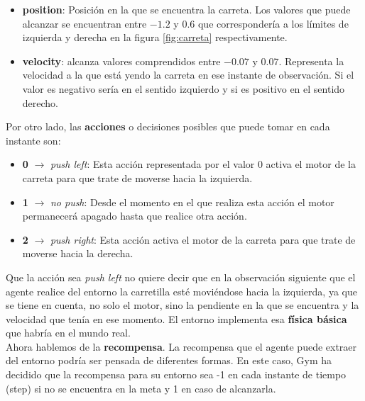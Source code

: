 \documentclass[11pt,fleqn]{book} %
\begin{document}
\begin{itemize}
	\item \textbf{position}: Posición en la que se encuentra la carreta. Los valores que puede alcanzar se encuentran entre $-1.2$ y $0.6$ que correspondería a los límites de izquierda y derecha en la figura \ref{fig:carreta} respectivamente. \\
	
	\item \textbf{velocity}: alcanza valores comprendidos entre $-0.07$ y $0.07$. Representa la velocidad a la que está yendo la carreta en ese instante de observación. Si el valor es negativo sería en el sentido izquierdo y si es positivo en el sentido derecho. \\
\end{itemize}

Por otro lado, las \textbf{acciones} o decisiones posibles que puede tomar en cada instante son: \\

\begin{itemize}
	\item \textbf{0} $\rightarrow$ \textit{push left}: Esta acción representada por el valor 0 activa el motor de la carreta para que trate de moverse hacia la izquierda. \\
	
	\item \textbf{1} $\rightarrow$ \textit{no push}: Desde el momento en el que realiza esta acción el motor permanecerá apagado hasta que realice otra acción. \\
	
	\item \textbf{2} $\rightarrow$ \textit{push right}: Esta acción activa el motor de la carreta para que trate de moverse hacia la derecha. \\	
\end{itemize}

Que la acción sea \textit{push left} no quiere decir que en la observación siguiente que el agente realice del entorno la carretilla esté moviéndose hacia la izquierda, ya que se tiene en cuenta, no solo el motor, sino la pendiente en la que se encuentra y la velocidad que tenía en ese momento. El entorno implementa esa \textbf{física básica} que habría en el mundo real. \\

Ahora hablemos de la \textbf{recompensa}. La recompensa que el agente puede extraer del entorno podría ser pensada de diferentes formas. En este caso, Gym ha decidido que la recompensa para su entorno sea -1 en cada instante de tiempo (step) si no se encuentra en la meta y 1 en caso de alcanzarla. \\
\end{document}
